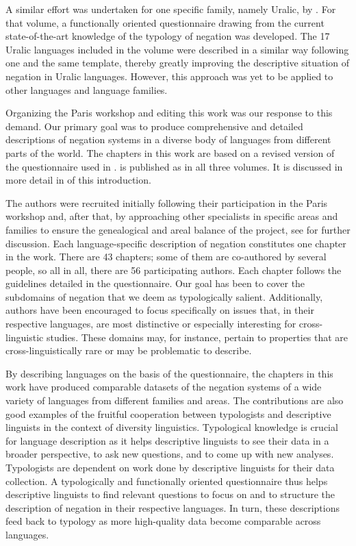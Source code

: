 \documentclass[output=paper,colorlinks,citecolor=brown]{langscibook}
\begin{document}
A similar effort was undertaken for one specific family, namely Uralic, by \citet{MiestamoEtAl2015}. For that volume, a functionally oriented questionnaire drawing from the current state-of-the-art knowledge of the typology of negation was developed. The 17 Uralic languages included in the volume were described in a similar way following one and the same template, thereby greatly improving the descriptive situation of negation in Uralic languages. However, this approach was yet to be applied to other languages and language families.

Organizing the Paris workshop and editing this work was our response to this demand. Our primary goal was to produce comprehensive and detailed descriptions of negation systems in a diverse body of languages from different parts of the world. The chapters in this work are based on a revised version of the questionnaire used in \citet{MiestamoEtAl2015}.  is published as  in all three volumes.
It is discussed in more detail in  of this introduction.

The authors were recruited initially following their participation in the Paris workshop and, after that, by approaching other specialists in specific areas and families to ensure the genealogical and areal balance of the project, see  for further discussion. Each language-specific description of negation constitutes one chapter in the work. There are 43 chapters; some of them are co-authored by several people, so all in all, there are 56 participating authors. Each chapter follows the guidelines detailed in the questionnaire. Our goal has been to cover the subdomains of negation that we deem as typologically salient. Additionally, authors have been encouraged to focus specifically on issues that, in their respective languages, are most distinctive or especially interesting for cross-linguistic studies. These domains may, for instance, pertain to properties that are cross-linguistically rare or may be problematic to describe. 

By describing languages on the basis of the questionnaire, the chapters in this work have produced comparable datasets of the negation systems of a wide variety of languages from different families and areas. The contributions are also good examples of the fruitful cooperation between typologists and descriptive linguists in the context of diversity linguistics. Typological knowledge is crucial for language description as it helps descriptive linguists to see their data in a broader perspective, to ask new questions, and to come up with new analyses. Typologists are dependent on work done by descriptive linguists for their data collection. A typologically and functionally oriented questionnaire thus helps descriptive linguists to find relevant questions to focus on and to structure the description of negation in their respective languages. In turn, these descriptions feed back to typology as more high-quality data become comparable across languages.
\end{document}
